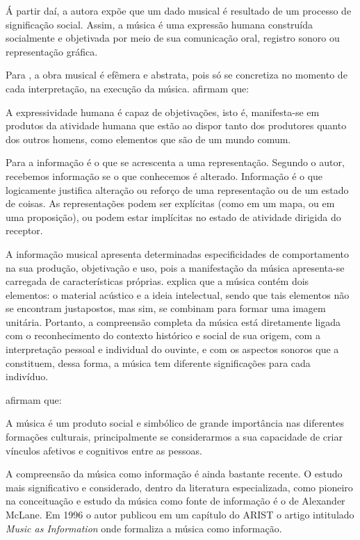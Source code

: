 Á partir daí, a autora  expõe que um dado musical é resultado de um processo de significação social. Assim, a música é uma expressão humana construída socialmente e objetivada por meio de sua comunicação oral, registro sonoro ou representação gráfica.

Para , a obra musical é efêmera e abstrata, pois só se concretiza no momento de cada interpretação, na execução da música.  afirmam que:

\begin{citacao}
A expressividade humana é capaz de objetivações, isto é, manifesta-se em produtos da atividade humana que estão ao dispor tanto dos produtores quanto dos outros homens, como elementos que são de um mundo comum.
\end{citacao}

Para  a informação é o que se acrescenta a uma representação. Segundo o autor, recebemos informação se o que conhecemos é alterado. Informação é o que logicamente justifica alteração ou reforço de uma representação ou de um estado de coisas. As representações podem ser explícitas (como em um mapa, ou em uma proposição), ou podem estar implícitas no estado de atividade dirigida do receptor.

A informação musical apresenta determinadas especificidades de comportamento na sua produção, objetivação e uso, pois a manifestação da música apresenta-se carregada de características próprias.  explica que a música contém dois elementos: o material acústico e a ideia intelectual, sendo que tais elementos não se encontram justapostos, mas sim, se combinam para formar uma imagem unitária. Portanto, a compreensão completa da música está diretamente ligada com o reconhecimento do contexto histórico e social de sua origem, com a interpretação pessoal e individual do ouvinte, e com os aspectos sonoros que a constituem, dessa forma, a música tem diferente significações para cada indivíduo.

 afirmam que:

\begin{citacao}
A música é um produto social e simbólico de grande importância nas diferentes formações culturais, principalmente se considerarmos a sua capacidade de criar vínculos afetivos e cognitivos entre as pessoas.
\end{citacao}

A compreensão da música como informação é ainda bastante recente. O estudo mais significativo e considerado, dentro da literatura especializada, como pioneiro na conceituação e estudo da música como fonte de informação é o de Alexander McLane. Em 1996 o autor publicou em um capítulo do ARIST  o artigo intitulado \textit{Music as Information} onde formaliza a música como informação.


